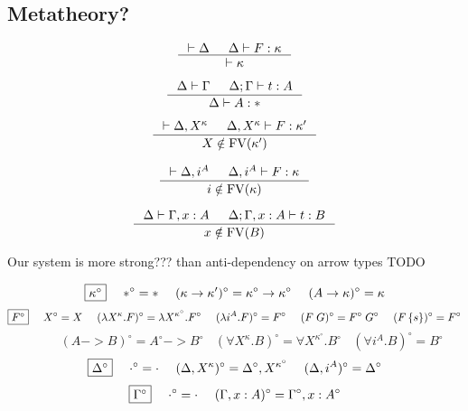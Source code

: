 \subsection{Metatheory?}

\begin{proposition}
\[ \inference{ |- \Delta & \Delta |- F : \kappa}{ |- \kappa }
\]
\end{proposition}

\begin{proposition}
\[ \inference{ \Delta |- \Gamma & \Delta;\Gamma |- t : A}{ \Delta |- A : * }
\]
\end{proposition}

\begin{proposition}
\[ \inference{ |- \Delta,X^\kappa
             & \Delta,X^\kappa |- F : \kappa' }
             { X\notin\FV(\kappa') }
\]
\end{proposition}

\begin{proposition}
\[ \inference{ |- \Delta,i^A
             & \Delta,i^A |- F : \kappa }
             { i\notin\FV(\kappa) }
\]
\end{proposition}

\begin{proposition}
\[ \inference{ \Delta |- \Gamma,x:A
             & \Delta;\Gamma,x:A |- t : B }
             { x\notin\FV(B) }
\]
\end{proposition}

\begin{remark} Our system is more strong??? than anti-dependency on arrow types
TODO
\end{remark}

\begin{definition}
\[ \fbox{$\kappa^\circ$}
 ~~~~
 *^\circ =
 *
 ~~~~
 (\kappa -> \kappa')^\circ =
 \kappa^\circ -> \kappa^\circ
 ~~~~
 (A -> \kappa)^\circ =
 \kappa
\]
\[ \fbox{$F^\circ$}
 ~~~~
 X^\circ =
 X
 ~~~~
 (\lambda X^\kappa.F)^\circ =
 \lambda X^{\kappa^\circ}.F^\circ
 ~~~~
 (\lambda i^A.F)^\circ =
 F^\circ
 ~~~~
 (F\;G)^\circ =
 F^\circ\;G^\circ
 ~~~~
 (F\,\{s\})^\circ =
 F^\circ
\]
\[ ~~~~ ~~~~ ~~~~
 (A -> B)^\circ =
 A^\circ -> B^\circ
 ~~~~
 (\forall X^\kappa . B)^\circ =
 \forall X^{\kappa^\circ} . B^\circ
 ~~~~
 (\forall i^A . B)^\circ =
 B^\circ
\]
\[ \fbox{$\Delta^\circ$}
 ~~~~
 \cdot^\circ = \cdot
 ~~~~
 (\Delta,X^\kappa)^\circ = \Delta^\circ,X^{\kappa^\circ}
 ~~~~
 (\Delta,i^A)^\circ = \Delta^\circ
\]
\[ \fbox{$\Gamma^\circ$}
 ~~~~
 \cdot^\circ = \cdot
 ~~~~
 (\Gamma,x:A)^\circ = \Gamma^\circ,x:A^\circ
\]
\end{definition}

